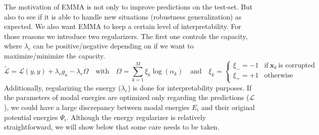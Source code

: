 The motivation of EMMA is not only to improve predictions on the test-set. But also to see if it is able to handle new situations (robustness generalization) as expected. We also want EMMA to keep a certain level of interpretability. For those reasons we introduce two regularizers. The first one controls the capacity, where $\lambda_c$ can be positive/negative depending on if we want to maximize/minimize the capacity.
\begin{equation}
\tilde{\mathcal{L}} = \mathcal{L}(y,\hat{y}) + \lambda_c g_a - \lambda_e \Omega \quad \text{with} \quad \Omega = \sum_{k=1}^M \xi_k \log(\alpha_k) \quad \text{and} \quad \xi_k = \begin{cases}
      \xi_- = -1 & \text{if}\ \mathbf{x}_k\, \text{is corrupted} \\
      \xi_+ = +1 & \text{otherwise}
    \end{cases}
\label{eq:regularization}
\end{equation}
Additionally, regularizing the energy ($\lambda_e$) is done for interpretability purposes. If the parameters of modal energies are optimized only regarding the predictions ($\mathcal{L}$), we could have a large discrepancy between modal energies $E_i$ and their original potential energies $\Psi_i$. Although the energy regularizer is relatively straightforward, we will show below that some care needs to be taken.

